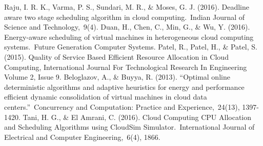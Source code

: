 \begin{thebibliography}{99}
\begin{LTRbibitems}
	  Raju, I. R. K., Varma, P. S., Sundari, M. R., \& Moses, G. J. (2016). Deadline aware two stage scheduling algorithm in cloud computing. Indian Journal of Science and Technology, 9(4).
	  Duan, H., Chen, C., Min, G., \& Wu, Y. (2016). Energy-aware scheduling of virtual machines in heterogeneous cloud computing systems. Future Generation Computer Systems.
	  Patel, R., Patel, H., \& Patel, S. (2015). Quality of Service Based Efficient Resource Allocation in Cloud Computing, International Journal For Technological Research In Engineering Volume 2, Issue 9.
	  Beloglazov, A., \& Buyya, R. (2013). “Optimal online deterministic algorithms and adaptive heuristics for energy and performance efficient dynamic consolidation of virtual machines in cloud data centers.” Concurrency and Computation: Practice and Experience, 24(13), 1397-1420.
	  Tani, H. G., \& El Amrani, C. (2016). Cloud Computing CPU Allocation and Scheduling Algorithms using CloudSim Simulator. International Journal of Electrical and Computer Engineering, 6(4), 1866.
	\end{LTRbibitems}
\end{thebibliography}
